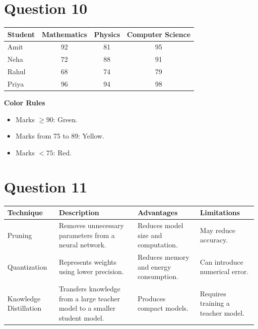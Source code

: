 \documentclass[12pt,a4paper]{article}
\begin{document}
\section*{Question 10}
\begin{center}
\begin{tabular}{|l|c|c|c|}
\hline
\rowcolor{headerblue}
\color{white}\textbf{Student} &
\color{white}\textbf{Mathematics} &
\color{white}\textbf{Physics} &
\color{white}\textbf{Computer Science}\\
\hline
Amit & \cellcolor{greenmark}92 & \cellcolor{yellowmark}81 & \cellcolor{greenmark}95\\
Neha & \cellcolor{redmark}72 & \cellcolor{yellowmark}88 & \cellcolor{greenmark}91\\
Rahul & \cellcolor{redmark}68 & \cellcolor{redmark}74 & \cellcolor{yellowmark}79\\
Priya & \cellcolor{greenmark}96 & \cellcolor{greenmark}94 & \cellcolor{greenmark}98\\
\hline
\end{tabular}
\end{center}

\noindent\textbf{Color Rules}
\begin{itemize}
    \item Marks $\geq 90$: Green.
    \item Marks from 75 to 89: Yellow.
    \item Marks $<75$: Red.
\end{itemize}

\section*{Question 11}
\begin{center}
\small
\begin{tabularx}{\textwidth}{|>{\raggedright\arraybackslash}p{2.5cm}|X|X|X|}
\hline
\textbf{Technique} & \textbf{Description} & \textbf{Advantages} & \textbf{Limitations}\\
\hline
Pruning &
Removes unnecessary parameters from a neural network. &
Reduces model size and computation. &
May reduce accuracy.\\
\hline
Quantization &
Represents weights using lower precision. &
Reduces memory and energy consumption. &
Can introduce numerical error.\\
\hline
Knowledge Distillation &
Transfers knowledge from a large teacher model to a smaller student model. &
Produces compact models. &
Requires training a teacher model.\\
\hline
\end{tabularx}
\end{center}
\end{document}
